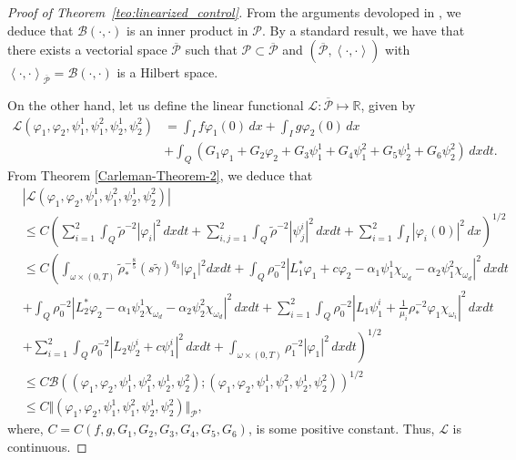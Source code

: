 \documentclass[11pt,a4paper]{amsart}
\numberwithin{equation}{section}
\begin{document}
\begin{proof}[Proof of Theorem~\ref{teo:linearized_control}]
\noindent From the arguments devoloped in \cite{FurImanu}, we deduce that $\mathcal{B}(\cdot,\cdot)$  is an inner product in   $\mathcal{P}$. By a standard result, we have   that  there  exists  a  vectorial space  $\overline{\mathcal{P}}$  such that  $\mathcal{P} \subset \overline{\mathcal{P}}$  and  $\left( \overline{\mathcal{P}},  \left\langle \cdot,\cdot \right\rangle   \right)$  with  $\left\langle \cdot, \cdot \right\rangle_{\overline{\mathcal{P}}}=\mathcal{B}(\cdot,\cdot) $  is  a  Hilbert space.

\noindent On the other hand, let us    define  the  linear  functional  $\mathcal{L}: \overline{\mathcal{P}}\mapsto \mathbb{R}$,  given by 
\begin{align*}
 \mathcal{L} (\varphi_{1}, \varphi_{2}, \psi^{1}_{1}, \psi^{2}_{1},  \psi^{1}_{2}, \psi^{2}_{2})  &= \int_{I}f\varphi_{1}(0)\,dx+\int_{I}g \varphi_{2}(0)\,dx\\   
 &	+\int_{Q}\left( G_{1}\varphi_{1}+G_{2}\varphi_{2}+G_{3}\psi^{1}_{1}+G_{4}\psi^{2}_{1}+G_{5}\psi^{1}_{2}+G_{6}\psi^{2}_{2}  \right)\,dxdt.
\end{align*}From Theorem \ref{Carleman-Theorem-2}, we deduce that
\begin{align*}
 & \left| \mathcal{L}   (\varphi_{1}, \varphi_{2}, \psi^{1}_{1}, \psi^{2}_{1},  \psi^{1}_{2}, \psi^{2}_{2}) \right|  \\
  & \leq C \left( \sum_{i=1}^{2}\int_{Q}\tilde{\rho}^{-2}|\varphi_{i}|^{2}\,dxdt+\sum_{i,j=1}^{2}\int_{Q} \tilde{\rho}^{-2}|\psi^{i}_{j}|^{2}\,dxdt+\sum_{i=1}^{2}\int_{I}|\varphi_{i}(0)|^{2}\,dx  \right)^{1/2}\\
  & \leq C \left( 
	\int_{\omega\times (0,T)}\tilde{\rho}^{-\frac{8}{5}}_{*}(s\tilde{\gamma})^{q_3}\vert \varphi_1 \vert^2dxdt +\displaystyle \int_{Q} \rho^{-2}_{0}| L^{*}_{1}\varphi_{1}+c\varphi_{2}-\alpha_{1}\psi^{1}_{1}\chi_{\omega_{d}}-\alpha_{2}\psi^{2}_{1}\chi_{\omega_{d}}|^{2}\,dxdt\right.\\
    & +\int_{Q} \rho^{-2}_{0}| L^{*}_{2}\varphi_{2}-\alpha_{1}\psi^{1}_{2}\chi_{\omega_{d}}-\alpha_{2}\psi^{2}_{2}\chi_{\omega_{d}}|^{2} \,dxdt +\sum^{2}_{i=1}\int_{Q}\rho^{-2}_{0}| L_{1}\psi^{i}_{1}+\frac{1}{\mu_{i}}\rho^{-2}_{*}\varphi_{1}\chi_{\omega_{i}}  |^{2}\,dxdt\\
    &+\left.\sum^{2}_{i=1}\int_{Q}\rho^{-2}_{0}|L_{2}\psi^{i}_{2}+c\psi^{i}_{1}|^{2}\,dxdt + \int_{\omega\times (0,T)}\rho^{-2}_{1}|\varphi_{1}|^{2}\,dxdt
		\right)^{1/2}\\
        &\leq C \mathcal{B}\left((\varphi_{1},\varphi_{2},\psi^{1}_{1},\psi^{2}_{1},\psi^{1}_{2},\psi^{2}_{2}); (\varphi_{1},\varphi_{2},\psi^{1}_{1},\psi^{2}_{1},\psi^{1}_{2},\psi^{2}_{2}) \right)^{1/2}\\
        &\leq C \Vert(\varphi_{1},\varphi_{2},\psi^{1}_{1},\psi^{2}_{1},\psi^{1}_{2},\psi^{2}_{2})\Vert_{\mathcal{P}},
\end{align*}where,  $C=C\left(f,g,G_{1},G_{2},G_{3},G_{4},G_{5},G_{6}\right)$, is some positive constant. Thus, $\mathcal{L}$ is continuous.




\end{proof}
\end{document}
